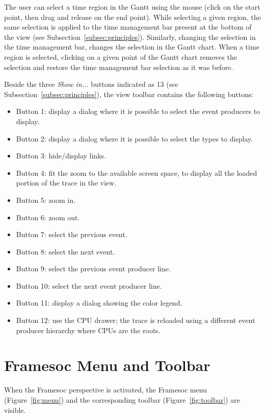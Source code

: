 \documentclass[twoside]{article}
\begin{document}
\begin{sloppypar}
The user can select a time region in the Gantt using the mouse (click on the start point, then drag and release on the end point). 
While selecting a given region, the same selection is applied to the time management bar present at the bottom of the view (see Subsection~\ref{subsec:principles}).
Similarly, changing the selection in the time management bar, changes the selection in the Gantt chart.
When a time region is selected, clicking on a given point of the Gantt chart removes the selection and restore the time management bar selection as it was before.

Beside the three \emph{Show in...} buttons indicated as \num{13} (see Subsection~\ref{subsec:principles}), the view toolbar contains the following buttons:
\begin{itemize}
	\item Button \num{1}: display a dialog where it is possible to select the event producers to display.
	\item Button \num{2}: display a dialog where it is possible to select the types to display.
	\item Button \num{3}: hide/display links.
	\item Button \num{4}: fit the zoom to the available screen space, to display all the loaded portion of the trace in the view.
    \item Button \num{5}: zoom in.
	\item Button \num{6}: zoom out.
  	\item Button \num{7}: select the previous event.
	\item Button \num{8}: select the next event.
	\item Button \num{9}: select the previous event producer line.
	\item Button \num{10}: select the next event producer line.
    \item Button \num{11}: display a dialog showing the color legend. 
	\item Button \num{12}: use the CPU drawer; the trace is reloaded using a different event producer hierarchy where CPUs are the roots.
\end{itemize}

\section{Framesoc Menu and Toolbar}
\label{sec:menu}

When the Framesoc perspective is activated, the Framesoc menu (Figure~\ref{fig:menu}) and the corresponding toolbar (Figure~\ref{fig:toolbar}) are visible. 


\end{sloppypar}
\end{document}
